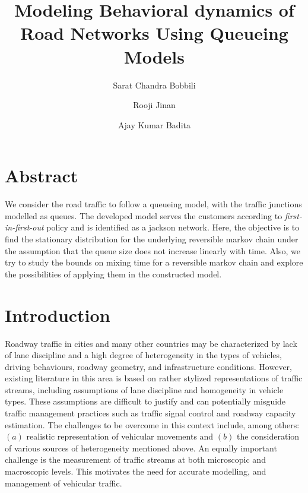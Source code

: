 \documentclass[a4paper,12pt]{scrartcl}
\date{}
\begin{document}
\title{Modeling Behavioral dynamics of Road Networks Using Queueing Models}
\author{
Sarat Chandra Bobbili\\
\and
Rooji Jinan\\
\and
Ajay Kumar Badita\\
}
\maketitle

\section*{Abstract}
We consider the road traffic to follow a queueing model, with the traffic junctions modelled as queues. 
The developed model serves the customers according to \emph{first-in-first-out} policy and is identified as a jackson network. 
Here, the objective is to find the stationary distribution for the underlying reversible markov chain under the assumption that the queue size does not increase linearly with time.
Also, we try to study the bounds on mixing time for a reversible markov chain and explore the possibilities of applying them in the constructed model.




\section{Introduction}
Roadway traffic in cities and many other countries may be characterized by lack of lane discipline and a high degree of heterogeneity in the types of vehicles, driving behaviours, roadway geometry, and infrastructure conditions.
However, existing literature in this area is based on rather stylized representations of traffic streams, including assumptions of lane discipline and homogeneity in vehicle types.
These assumptions are difficult to justify and can potentially misguide traffic management practices such as traffic signal control and roadway capacity estimation.
The challenges to be overcome in this context include, among others: $(a)$ realistic representation of vehicular movements and $(b)$ the consideration of various sources of heterogeneity mentioned above.
An equally important challenge is the measurement of traffic streams at both microscopic and macroscopic levels.
This motivates the need for accurate modelling, and management of vehicular traffic.\\
\end{document}
